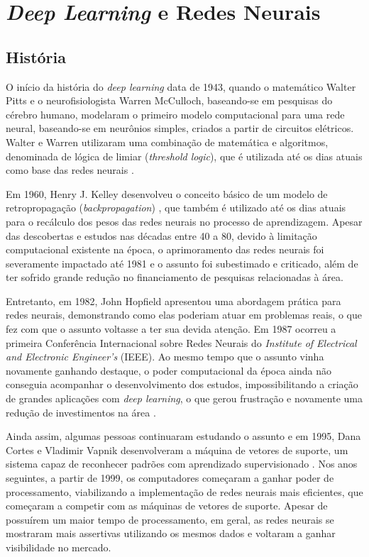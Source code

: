 \section{\textit{Deep Learning} e Redes Neurais}

\subsection{História}
\indent
\par O início da história do \textit{deep learning} data de 1943, quando o matemático Walter Pitts e o neurofisiologista Warren McCulloch, baseando-se em pesquisas do cérebro humano, modelaram o primeiro modelo computacional para uma rede neural, baseando-se em neurônios simples, criados a partir de circuitos elétricos. Walter e Warren utilizaram uma combinação de matemática e algoritmos, denominada de lógica de limiar (\textit{threshold logic}), que é utilizada até os dias atuais como base das redes neurais \cite{Academy2019}.

\par Em 1960, Henry J. Kelley desenvolveu o conceito básico de um modelo de retropropagação (\textit{backpropagation}) \cite{Foote2019}, que também é utilizado até os dias atuais para o recálculo dos pesos das redes neurais no processo de aprendizagem. Apesar das descobertas e estudos nas décadas entre 40 a 80, devido à limitação computacional existente na época, o aprimoramento das redes neurais foi severamente impactado até 1981 e o assunto foi subestimado e criticado, além de ter sofrido grande redução no financiamento de pesquisas relacionadas à área.

\par Entretanto, em 1982, John Hopfield apresentou uma abordagem prática para redes neurais, demonstrando como elas poderiam atuar em problemas reais, o que fez com que o assunto voltasse a ter sua devida atenção. Em 1987 ocorreu a primeira Conferência Internacional sobre Redes Neurais do \textit{Institute of Electrical and Electronic Engineer’s} (IEEE). Ao mesmo tempo que o assunto vinha novamente ganhando destaque, o poder computacional da época ainda não conseguia acompanhar o desenvolvimento dos estudos, impossibilitando a criação de grandes aplicações com \textit{deep learning}, o que gerou frustração e novamente uma redução de investimentos na área \cite{Academy2019}.

\par Ainda assim, algumas pessoas continuaram estudando o assunto e em 1995, Dana Cortes e Vladimir Vapnik desenvolveram a máquina de vetores de suporte, um sistema capaz de reconhecer padrões com aprendizado supervisionado \cite{Foote2019}. Nos anos seguintes, a partir de 1999, os computadores começaram a ganhar poder de processamento, viabilizando a implementação de redes neurais mais eficientes, que começaram a competir com as máquinas de vetores de suporte. Apesar de possuírem um maior tempo de processamento, em geral, as redes neurais se mostraram mais assertivas utilizando os mesmos dados e voltaram a ganhar visibilidade no mercado.

